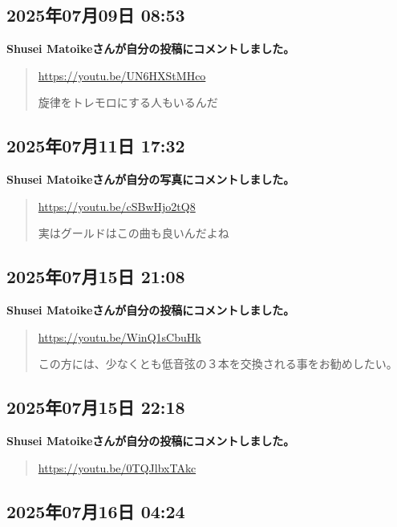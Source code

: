 \subsection*{2025年07月09日 08:53}

\textbf{Shusei Matoikeさんが自分の投稿にコメントしました。}

\begin{quote}
\url{https://youtu.be/UN6HXStMHco}

旋律をトレモロにする人もいるんだ
\end{quote}

\subsection*{2025年07月11日 17:32}

\textbf{Shusei Matoikeさんが自分の写真にコメントしました。}

\begin{quote}
\url{https://youtu.be/cSBwHjo2tQ8}

実はグールドはこの曲も良いんだよね
\end{quote}

\subsection*{2025年07月15日 21:08}

\textbf{Shusei Matoikeさんが自分の投稿にコメントしました。}

\begin{quote}
\url{https://youtu.be/WinQ1sCbuHk}

この方には、少なくとも低音弦の３本を交換される事をお勧めしたい。
\end{quote}

\subsection*{2025年07月15日 22:18}

\textbf{Shusei Matoikeさんが自分の投稿にコメントしました。}

\begin{quote}
\url{https://youtu.be/0TQJlbxTAkc}
\end{quote}

\subsection*{2025年07月16日 04:24}

